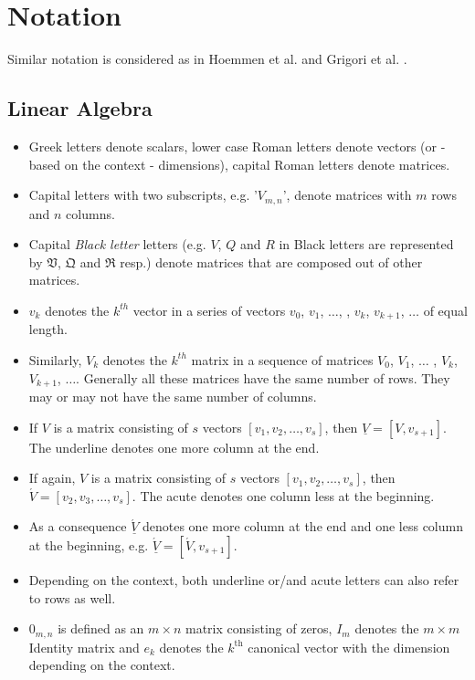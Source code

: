 \documentclass{scrartcl}
\numberwithin{equation}{section}
\begin{document}
\pagebreak

\tableofcontents

\pagebreak

\section*{Notation}
Similar notation is considered as in Hoemmen et al. \cite{Hoemmen:2010:CKS:1970638} and Grigori et al. \cite{Grigori}.
\subsection*{Linear Algebra}
\begin{itemize}
\item Greek letters denote scalars, lower case Roman letters denote vectors (or - based on the context - dimensions), capital Roman letters denote matrices.
\item Capital letters with two subscripts, e.g. '$V_{m, n}$', denote matrices with $m$ rows and $n$ columns.
\item Capital \textit{Black letter} letters (e.g. $V$, $Q$ and $R$ in Black letters are represented by $\mathfrak{V}$, $\mathfrak{Q}$ and $\mathfrak{R}$ resp.) denote matrices that are composed out of other matrices. 
\item $v_k$ denotes the $k^{th}$ vector in a series of vectors $v_0$, $v_1$, $\ldots$, ,  $v_k$, $v_{k+1}$, $\ldots$ of equal length.
\item Similarly, $V_k$ denotes the $k^{th}$ matrix in a sequence of matrices $V_0$, $V_1$, $\ldots$ , $V_k$, $V_{k+1}$, $\ldots$. Generally all these matrices have the same number of rows. They may or may not have the same number of columns.
\item If $V$ is a matrix consisting of $s$ vectors $\left[v_1, v_2, \ldots, v_s\right]$, then $\underline{V} = \left[V, v_{s+1} \right]$. The underline denotes one more column at the end.
\item If again, $V$ is a matrix consisting of $s$ vectors $\left[v_1, v_2, \ldots, v_s\right]$, then $\acute{V} = [v_2, v_3, \ldots, v_s]$. The acute denotes one column less at the beginning.
\item As a consequence $\underline{\acute{V}}$ denotes one more column at the end and one less column at the beginning, e.g. $\underline{\acute{V}} = [\acute{V}, v_{s+1}]$.
\item Depending on the context, both underline or/and acute letters can also refer to rows as well. 
\item $0_{m, n}$ is defined as an $m \times n$ matrix consisting of zeros, $I_{m}$ denotes the $m \times m$ Identity matrix and $e_k$ denotes the $k^{\text{th}}$ canonical vector with the dimension depending on the context.

\end{itemize}
\end{document}
